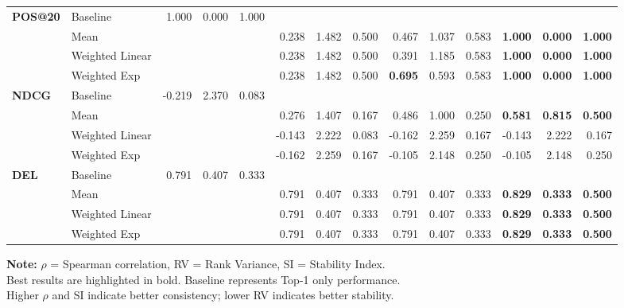 \documentclass{article}
\begin{document}
\begin{table}[htbp]
\begin{tabular}{@{}llrrr|rrr|rrr|rrr@{}}
\multirow{4}{*}{\textbf{POS@20}} 
& Baseline & 1.000 & 0.000 & 1.000 & & & & & & & & & \\
& Mean & & & & 0.238 & 1.482 & 0.500 & 0.467 & 1.037 & 0.583 & \textbf{1.000} & \textbf{0.000} & \textbf{1.000} \\
& Weighted Linear & & & & 0.238 & 1.482 & 0.500 & 0.391 & 1.185 & 0.583 & \textbf{1.000} & \textbf{0.000} & \textbf{1.000} \\
& Weighted Exp & & & & 0.238 & 1.482 & 0.500 & \textbf{0.695} & 0.593 & 0.583 & \textbf{1.000} & \textbf{0.000} & \textbf{1.000} \\
\midrule

\multirow{4}{*}{\textbf{NDCG}} 
& Baseline & -0.219 & 2.370 & 0.083 & & & & & & & & & \\
& Mean & & & & 0.276 & 1.407 & 0.167 & 0.486 & 1.000 & 0.250 & \textbf{0.581} & \textbf{0.815} & \textbf{0.500} \\
& Weighted Linear & & & & -0.143 & 2.222 & 0.083 & -0.162 & 2.259 & 0.167 & -0.143 & 2.222 & 0.167 \\
& Weighted Exp & & & & -0.162 & 2.259 & 0.167 & -0.105 & 2.148 & 0.250 & -0.105 & 2.148 & 0.250 \\
\midrule

\multirow{4}{*}{\textbf{DEL}} 
& Baseline & 0.791 & 0.407 & 0.333 & & & & & & & & & \\
& Mean & & & & 0.791 & 0.407 & 0.333 & 0.791 & 0.407 & 0.333 & \textbf{0.829} & \textbf{0.333} & \textbf{0.500} \\
& Weighted Linear & & & & 0.791 & 0.407 & 0.333 & 0.791 & 0.407 & 0.333 & \textbf{0.829} & \textbf{0.333} & \textbf{0.500} \\
& Weighted Exp & & & & 0.791 & 0.407 & 0.333 & 0.791 & 0.407 & 0.333 & \textbf{0.829} & \textbf{0.333} & \textbf{0.500} \\

\bottomrule
\end{tabular}
\begin{flushleft}
\textbf{Note:} $\rho$ = Spearman correlation, RV = Rank Variance, SI = Stability Index. \\
Best results are highlighted in bold. Baseline represents Top-1 only performance. \\
Higher $\rho$ and SI indicate better consistency; lower RV indicates better stability.
\end{flushleft}
\end{table}
\end{document}
